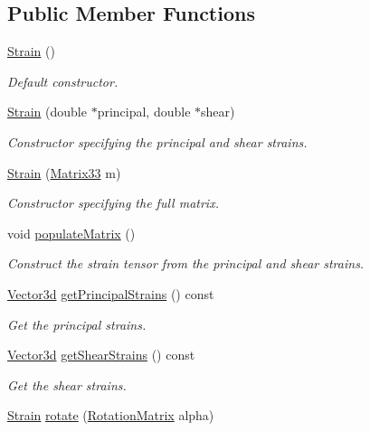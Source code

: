 \subsection*{\-Public \-Member \-Functions}
\begin{DoxyCompactItemize}
\item 
\hyperlink{classStrain_ad7580e057dd173ba4a4609f4edfe6e38}{\-Strain} ()
\begin{DoxyCompactList}\small\item\em \-Default constructor. \end{DoxyCompactList}\item 
\hyperlink{classStrain_a808b5a0e273cc87e19138f3be221fe53}{\-Strain} (double $\ast$principal, double $\ast$shear)
\begin{DoxyCompactList}\small\item\em \-Constructor specifying the principal and shear strains. \end{DoxyCompactList}\item 
\hyperlink{classStrain_a411164cde64f3c51520440f928fb8fd8}{\-Strain} (\hyperlink{classMatrix33}{\-Matrix33} m)
\begin{DoxyCompactList}\small\item\em \-Constructor specifying the full matrix. \end{DoxyCompactList}\item 
void \hyperlink{classStrain_a53d0c01b18a8c70da97ad4aaeb924f14}{populate\-Matrix} ()
\begin{DoxyCompactList}\small\item\em \-Construct the strain tensor from the principal and shear strains. \end{DoxyCompactList}\item 
\hyperlink{classVector3d}{\-Vector3d} \hyperlink{classStrain_a441936c89c087ec4ca9927e914a2cece}{get\-Principal\-Strains} () const 
\begin{DoxyCompactList}\small\item\em \-Get the principal strains. \end{DoxyCompactList}\item 
\hyperlink{classVector3d}{\-Vector3d} \hyperlink{classStrain_a12320d54bd51c0e31159da2d30a8f380}{get\-Shear\-Strains} () const 
\begin{DoxyCompactList}\small\item\em \-Get the shear strains. \end{DoxyCompactList}\item 
\hyperlink{classStrain}{\-Strain} \hyperlink{classStrain_a39acbb854eea7868d2b88c6106e80d18}{rotate} (\hyperlink{classRotationMatrix}{\-Rotation\-Matrix} alpha)

\end{DoxyCompactItemize}
